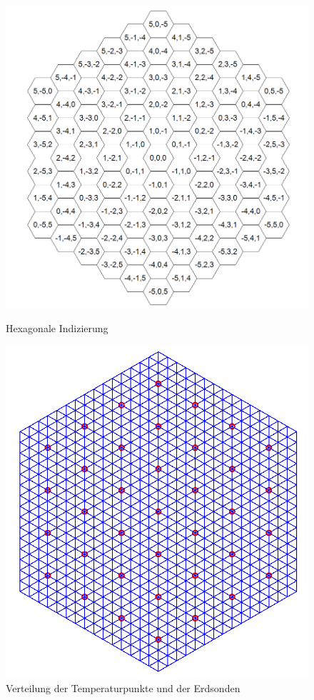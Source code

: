 \documentclass[12pt,a4paper]{article}
\begin{document}
\begin{figure}[h]
    \begin{minipage}[t]{.4\linewidth} %
       \includegraphics[width=1.1\linewidth]{HexCoord.png}
       \caption{Hexagonale Indizierung}
    \end{minipage}
    \hspace{.1\linewidth}%
    \begin{minipage}[t]{.4\linewidth} %
       \includegraphics[width=\linewidth]{BoreHoleNet.png}
       \caption{Verteilung der Temperaturpunkte und der Erdsonden}
    \end{minipage}
 \end{figure}
\end{document}
